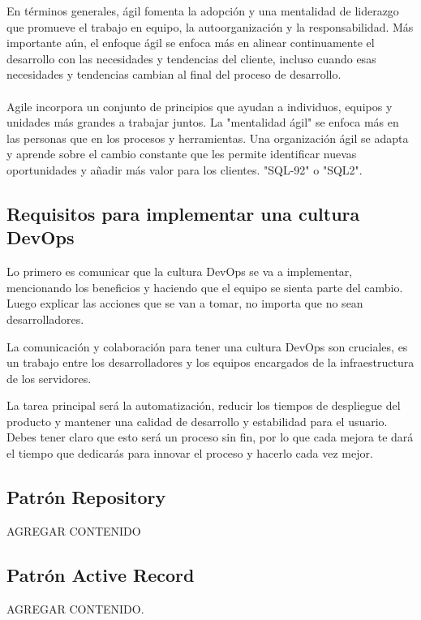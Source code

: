 \documentclass[preprint,12pt]{elsarticle}
\begin{document}
En términos generales, ágil fomenta la adopción y una mentalidad de liderazgo que promueve el trabajo en equipo, la autoorganización y la responsabilidad. Más importante aún, el enfoque ágil se enfoca más en alinear continuamente el desarrollo con las necesidades y tendencias del cliente, incluso cuando esas necesidades y tendencias cambian al final del proceso de desarrollo.
\\
\\
Agile incorpora un conjunto de principios que ayudan a individuos, equipos y unidades más grandes a trabajar juntos. La "mentalidad ágil" se enfoca más en las personas que en los procesos y herramientas. Una organización ágil se adapta y aprende sobre el cambio constante que les permite identificar nuevas oportunidades y añadir más valor para los clientes. "SQL-92" o "SQL2".\cite{referenciarobles1}
\\

\subsection{Requisitos para implementar una cultura DevOps}
Lo primero es comunicar que la cultura DevOps se va a implementar, mencionando los beneficios y haciendo que el equipo se sienta parte del cambio. Luego explicar las acciones que se van a tomar, no importa que no sean desarrolladores.

La comunicación y colaboración para tener una cultura DevOps son cruciales, es un trabajo entre los desarrolladores y los equipos encargados de la infraestructura de los servidores.

La tarea principal será la automatización, reducir los tiempos de despliegue del producto y mantener una calidad de desarrollo y estabilidad para el usuario. Debes tener claro que esto será un proceso sin fin, por lo que cada mejora te dará el tiempo que dedicarás para innovar el proceso y hacerlo cada vez mejor.\cite{referenciarobles2}


\subsection{Patrón Repository}
AGREGAR CONTENIDO \cite{referenciaQuispe1}

\subsection{Patrón Active Record}
AGREGAR CONTENIDO.\cite{referenciaQuispe1}
\end{document}
